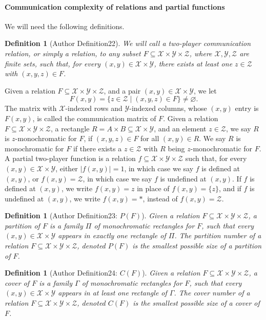 \documentclass[10pt,a4paper]{article}
\newtheorem{ntdefinition}[nttheorem]{Definition}
\begin{document}
\paragraph{Communication complexity of relations and partial functions}
We will need the following definitions.
\begin{ntdefinition}[Author Definition22]
We will call a two-player communication relation, or simply a relation, to any subset $F\subseteq\mathcal X\times\mathcal Y\times\mathcal Z$, where $\mathcal X,\mathcal Y,\mathcal Z$ are finite sets, such that, for every $(x,y)\in\mathcal X\times\mathcal Y$, there exists at least one $z\in\mathcal Z$ with $(x,y,z)\in F$.
\end{ntdefinition}
Given a relation $F\subseteq\mathcal X\times\mathcal Y\times\mathcal Z$, and a pair $(x,y)\in\mathcal X\times\mathcal Y$, we let
\[F(x,y)=\{z\in\mathcal Z\mid(x,y,z)\in F\}\ne\varnothing.\]
The matrix with $\mathcal X$-indexed rows and $\mathcal Y$-indexed columns, whose $(x,y)$ entry is $F(x,y)$, is called the communication matrix of $F$.
Given a relation $F\subseteq\mathcal X\times\mathcal Y\times\mathcal Z$, a rectangle $R=A\times B\subseteq\mathcal X\times\mathcal Y$, and an element $z\in\mathcal Z$, we say $R$ is $z$-monochromatic for $F$, if $(x,y,z)\in F$ for all $(x,y)\in R$. We say $R$ is monochromatic for $F$ if there exists a $z\in\mathcal Z$ with $R$ being $z$-monochromatic for $F$.
A partial two-player function is a relation $f\subseteq\mathcal X\times\mathcal Y\times\mathcal Z$ such that, for every $(x,y)\in\mathcal X\times\mathcal Y$, either $|f(x,y)|=1$, in which case we say $f$ is defined at $(x,y)$, or $f(x,y)=\mathcal Z$, in which case we say $f$ is undefined at $(x,y)$. If $f$ is defined at $(x,y)$, we write $f(x,y)=z$ in place of $f(x,y)=\{z\}$, and if $f$ is undefined at $(x,y)$, we write $f(x,y)=*$, instead of $f(x,y)=\mathcal Z$.
\begin{ntdefinition}[Author Definition23: $P(F)$]
Given a relation $F\subseteq\mathcal X\times\mathcal Y\times\mathcal Z$, a partition of $F$ is a family $\Pi$ of monochromatic rectangles for $F$, such that every $(x,y)\in\mathcal X\times\mathcal Y$ appears in exactly one rectangle of $\Pi$. The partition number of a relation $F\subseteq\mathcal X\times\mathcal Y\times\mathcal Z$, denoted $P(F)$ is the smallest possible size of a partition of $F$.
\end{ntdefinition}
\begin{ntdefinition}[Author Definition24: $C(F)$]
Given a relation $F\subseteq\mathcal X\times\mathcal Y\times\mathcal Z$, a cover of $F$ is a family $\Gamma$ of monochromatic rectangles for $F$, such that every $(x,y)\in\mathcal X\times\mathcal Y$ appears in at least one rectangle of $\Gamma$. The cover number of a relation $F\subseteq\mathcal X\times\mathcal Y\times\mathcal Z$, denoted $C(F)$ is the smallest possible size of a cover of $F$.
\end{ntdefinition}
\end{document}
